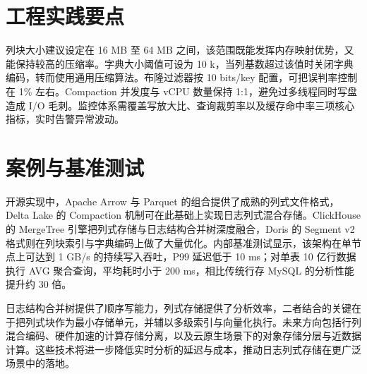 \chapter{工程实践要点}
列块大小建议设定在 16 MB 至 64 MB 之间，该范围既能发挥内存映射优势，又能保持较高的压缩率。字典大小阈值可设为 10 k，当列基数超过该值时关闭字典编码，转而使用通用压缩算法。布隆过滤器按 10 bits/key 配置，可把误判率控制在 1\%{} 左右。Compaction 并发度与 vCPU 数量保持 1:1，避免过多线程同时写盘造成 I/O 毛刺。监控体系需覆盖写放大比、查询裁剪率以及缓存命中率三项核心指标，实时告警异常波动。\par
\chapter{案例与基准测试}
开源实现中，Apache Arrow 与 Parquet 的组合提供了成熟的列式文件格式，Delta Lake 的 Compaction 机制可在此基础上实现日志列式混合存储。ClickHouse 的 MergeTree 引擎把列式存储与日志结构合并树深度融合，Doris 的 Segment v2 格式则在列块索引与字典编码上做了大量优化。内部基准测试显示，该架构在单节点上可达到 1 GB/s 的持续写入吞吐，P99 延迟低于 10 ms；对单表 10 亿行数据执行 AVG 聚合查询，平均耗时小于 200 ms，相比传统行存 MySQL 的分析性能提升约 30 倍。\par
日志结构合并树提供了顺序写能力，列式存储提供了分析效率，二者结合的关键在于把列式块作为最小存储单元，并辅以多级索引与向量化执行。未来方向包括行列混合编码、硬件加速的计算存储分离，以及云原生场景下的对象存储分层与近数据计算。这些技术将进一步降低实时分析的延迟与成本，推动日志列式存储在更广泛场景中的落地。\par
